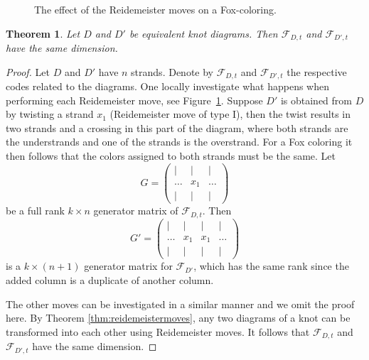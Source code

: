\documentclass[10pt,a4paper]{amsart}
\newtheorem{theorem}{Theorem}
\newcommand{\mF}{\mathcal{F}}
\begin{document}
\begin{figure}[ht]
    \centering
    
    \caption{The effect of the Reidemeister moves on a Fox-coloring.}
    \label{fig:fox_reidemeister}
\end{figure}

\begin{theorem}
\label{thm:dimreidemeister}
Let $D$ and $D'$ be equivalent knot diagrams. Then 
$\mF_{D,t}$ and $\mF_{D',t}$ have the same dimension.
\end{theorem}

\begin{proof}
Let $D$ and $D'$ have $n$ strands. Denote by $\mF_{D,t}$ and $\mF_{D',t}$ the respective codes related to the diagrams. One locally investigate what happens when performing each Reidemeister move, see 
Figure~\ref{fig:fox_reidemeister}. Suppose $D'$ is obtained from $D$ by twisting a strand $x_1$ (Reidemeister move of type I), then the twist results in two strands and a crossing in this part of the diagram, where both strands are the understrands and one of the strands is the overstrand. For a Fox coloring it then follows that the colors assigned to both strands must be the same. 
    Let 
    $$G = 
    \begin{pmatrix}
     | & | & | \\
    \dots & x_1 & \dots \\
    | & | & |
    \end{pmatrix}
    $$ 
    be a full rank $k \times n$ generator matrix of $\mF_{D,t}$.
    Then    $$G' = 
    \begin{pmatrix}
    | & | & | & |\\
    \dots & x_1 & x_1 & \dots\\
    | & | & | & | 
    \end{pmatrix}
    $$ 
    is a $k \times (n+1)$ generator matrix for $\mF_{D'}$, which has the same rank since the added column is a duplicate of another column.

    The other moves can be investigated
    in a similar manner and we omit the proof here. By Theorem \ref{thm:reidemeistermoves},
any two diagrams of a knot can be transformed into each other using Reidemeister moves. It follows that $\mF_{D,t}$ and $\mF_{D',t}$ have the same dimension.
\end{proof}
\end{document}
